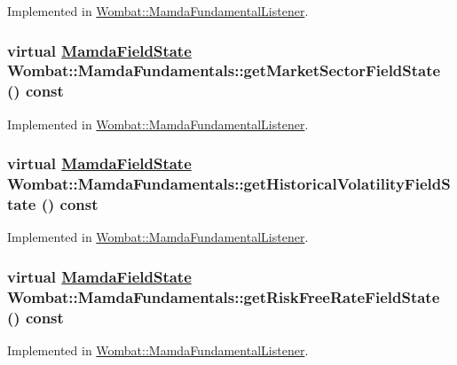 Implemented in \hyperlink{classWombat_1_1MamdaFundamentalListener_5fafb7554fa5481acfb2898b8eec29ae}{Wombat::Mamda\-Fundamental\-Listener}.\hypertarget{classWombat_1_1MamdaFundamentals_86af2cf92e30784822ef88cd2d8d8718}{
\subsubsection[getMarketSectorFieldState]{\setlength{\rightskip}{0pt plus 5cm}virtual \hyperlink{namespaceWombat_93aac974f2ab713554fd12a1fa3b7d2a}{Mamda\-Field\-State} Wombat::Mamda\-Fundamentals::get\-Market\-Sector\-Field\-State () const}}
\label{classWombat_1_1MamdaFundamentals_86af2cf92e30784822ef88cd2d8d8718}




Implemented in \hyperlink{classWombat_1_1MamdaFundamentalListener_4cb742287269d90b2e1484c30d995a6f}{Wombat::Mamda\-Fundamental\-Listener}.\hypertarget{classWombat_1_1MamdaFundamentals_239218fdf3b49bf438ae252d6db488fb}{
\subsubsection[getHistoricalVolatilityFieldState]{\setlength{\rightskip}{0pt plus 5cm}virtual \hyperlink{namespaceWombat_93aac974f2ab713554fd12a1fa3b7d2a}{Mamda\-Field\-State} Wombat::Mamda\-Fundamentals::get\-Historical\-Volatility\-Field\-State () const}}
\label{classWombat_1_1MamdaFundamentals_239218fdf3b49bf438ae252d6db488fb}




Implemented in \hyperlink{classWombat_1_1MamdaFundamentalListener_54c2f1ccf72199c1bff116b9e4a43992}{Wombat::Mamda\-Fundamental\-Listener}.\hypertarget{classWombat_1_1MamdaFundamentals_7551c3b1d9b0eba452270f4cf7627976}{
\subsubsection[getRiskFreeRateFieldState]{\setlength{\rightskip}{0pt plus 5cm}virtual \hyperlink{namespaceWombat_93aac974f2ab713554fd12a1fa3b7d2a}{Mamda\-Field\-State} Wombat::Mamda\-Fundamentals::get\-Risk\-Free\-Rate\-Field\-State () const}}
\label{classWombat_1_1MamdaFundamentals_7551c3b1d9b0eba452270f4cf7627976}




Implemented in \hyperlink{classWombat_1_1MamdaFundamentalListener_d93a5a6643c4f7c742aa588268ba646f}{Wombat::Mamda\-Fundamental\-Listener}.